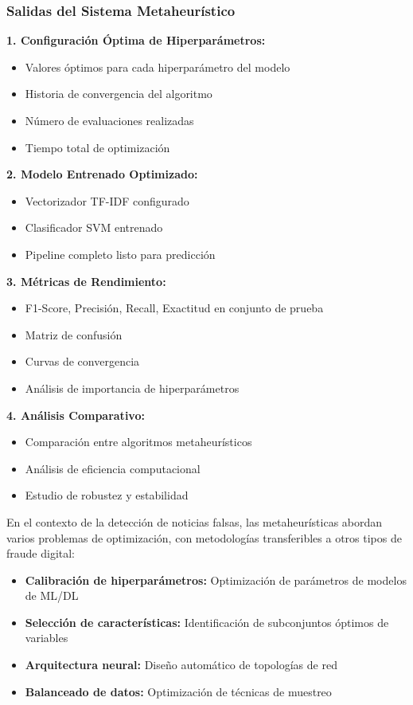 \subsubsection{Salidas del Sistema Metaheurístico}

\textbf{1. Configuración Óptima de Hiperparámetros:}
\begin{itemize}
    \item Valores óptimos para cada hiperparámetro del modelo
    \item Historia de convergencia del algoritmo
    \item Número de evaluaciones realizadas
    \item Tiempo total de optimización
\end{itemize}

\textbf{2. Modelo Entrenado Optimizado:}
\begin{itemize}
    \item Vectorizador TF-IDF configurado
    \item Clasificador SVM entrenado
    \item Pipeline completo listo para predicción
\end{itemize}

\textbf{3. Métricas de Rendimiento:}
\begin{itemize}
    \item F1-Score, Precisión, Recall, Exactitud en conjunto de prueba
    \item Matriz de confusión
    \item Curvas de convergencia
    \item Análisis de importancia de hiperparámetros
\end{itemize}

\textbf{4. Análisis Comparativo:}
\begin{itemize}
    \item Comparación entre algoritmos metaheurísticos
    \item Análisis de eficiencia computacional
    \item Estudio de robustez y estabilidad
\end{itemize}

En el contexto de la detección de noticias falsas, las metaheurísticas abordan varios problemas de optimización, con metodologías transferibles a otros tipos de fraude digital:
\begin{itemize}
    \item \textbf{Calibración de hiperparámetros:} Optimización de parámetros de modelos de ML/DL
    \item \textbf{Selección de características:} Identificación de subconjuntos óptimos de variables
    \item \textbf{Arquitectura neural:} Diseño automático de topologías de red
    \item \textbf{Balanceado de datos:} Optimización de técnicas de muestreo
\end{itemize}


